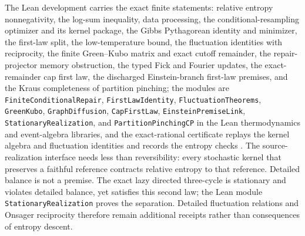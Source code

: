\documentclass[11pt]{article}
\begin{document}
The Lean development carries the exact finite statements: relative
entropy nonnegativity, the log-sum inequality, data processing, the
conditional-resampling optimizer and its kernel package, the Gibbs
Pythagorean identity and minimizer, the first-law split, the
low-temperature bound, the fluctuation identities with reciprocity,
the finite Green--Kubo matrix and exact cutoff remainder, the repair-projector
memory obstruction, the typed Fick and Fourier updates,
the exact-remainder cap first law, the discharged Einstein-branch
first-law premises, and the Kraus completeness of
partition pinching; the modules are \texttt{FiniteConditionalRepair},
\texttt{FirstLawIdentity}, \texttt{FluctuationTheorems},
\texttt{GreenKubo}, \texttt{GraphDiffusion}, \texttt{CapFirstLaw},
\texttt{EinsteinPremiseLink}, \texttt{StationaryRealization}, and
\texttt{PartitionPinchingCP} in the
Lean thermodynamics and event-algebra libraries, and the exact-rational
certificate replays the kernel algebra and fluctuation identities and
records the entropy checks
\cite{ophrepo}. The source-realization interface needs less than
reversibility: every stochastic kernel that preserves a faithful
reference contracts relative entropy to that reference. Detailed balance is
not a premise. The exact lazy directed three-cycle is stationary and violates
detailed balance, yet satisfies this second law; the Lean module
\texttt{StationaryRealization} proves the separation. Detailed fluctuation
relations and Onsager reciprocity therefore remain additional receipts rather
than consequences of entropy descent.
\end{document}
